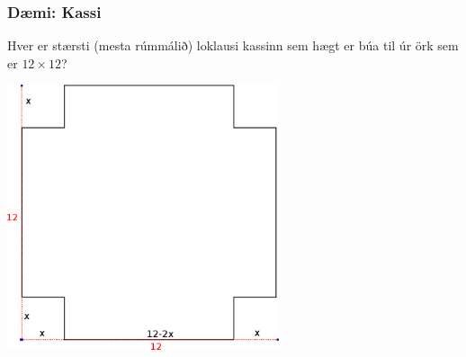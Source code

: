 \documentclass[icelandic,a4paper,12pt]{article}
\begin{document}
\subsubsection{Dæmi: Kassi}
Hver er stærsti (mesta rúmmálið) loklausi kassinn  sem hægt er
búa til úr örk sem er $12 \times 12$? 
\begin{center}
\includegraphics[width=8cm]{./myndir/kafli05/09_kassi.png}
\end{center}
\end{document}
